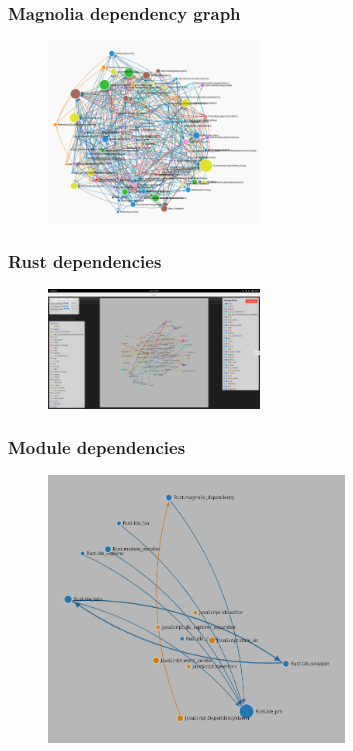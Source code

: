 \begin{frame}
  \frametitle{Magnolia dependency graph}
  \begin{figure}
    \centering
    \includegraphics[width=0.5\textwidth]{./pics/magnolia-dependencies.png}
  \end{figure}
\end{frame}

\begin{frame}
  \frametitle{Rust dependencies}
  \begin{figure}
    \centering
    \includegraphics[width=0.5\textwidth]{./pics/rust-deps.png}
  \end{figure}
\end{frame}

\begin{frame}
  \frametitle{Module dependencies}
  \begin{figure}
    \centering
      \includegraphics[width=0.7\textwidth]{./pics/module-dependencies.png}
  \end{figure}
\end{frame}
